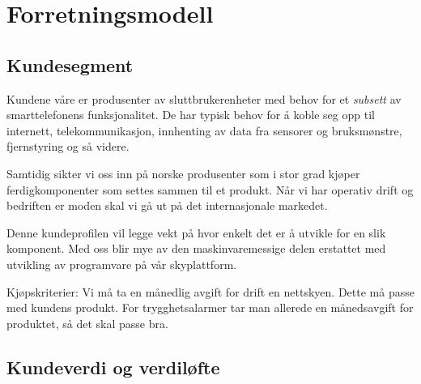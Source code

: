 \section{Forretningsmodell}

\subsection{Kundesegment}

Kundene våre er produsenter av sluttbrukerenheter med behov for et
\textit{subsett} av smarttelefonens funksjonalitet. De har typisk behov for å
koble seg opp til internett, telekommunikasjon, innhenting av data fra sensorer
og bruksmønstre, fjernstyring og så videre.

Samtidig sikter vi oss inn på norske produsenter som i stor grad kjøper
ferdigkomponenter som settes sammen til et produkt.  Når vi har operativ drift
og bedriften er moden skal vi gå ut på det internasjonale markedet.

Denne kundeprofilen vil legge vekt på hvor enkelt det er å utvikle for en slik
komponent. Med oss blir mye av den maskinvaremessige delen erstattet med
utvikling av programvare på vår skyplattform.

Kjøpskriterier: Vi må ta en månedlig avgift for drift en nettskyen. Dette må
passe med kundens produkt. For trygghetsalarmer tar man allerede en
månedsavgift for produktet, så det skal passe bra.




\subsection{Kundeverdi og verdiløfte}

